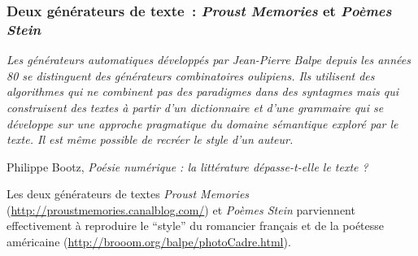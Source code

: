 \documentclass{article}
\newenvironment{citationbox}
{\begin{center}
		\begin{minipage}{.8\textwidth}
		}
		{
		\end{minipage}	
\end{center}
}
\begin{document}
			\subsubsection{Deux générateurs de texte~: \textit{Proust Memories} et \textit{Poèmes Stein}}
				\begin{citationbox}
					\textit{Les générateurs automatiques développés par Jean-Pierre Balpe depuis les années 80
					se distinguent des générateurs combinatoires oulipiens. Ils utilisent des algorithmes qui ne
					combinent pas des paradigmes dans des syntagmes mais qui construisent des textes à partir
					d’un dictionnaire et d’une grammaire qui se développe sur une approche pragmatique du
					domaine sémantique exploré par le texte. Il est même possible de recréer le style d’un auteur. }
					\begin{flushright}
						Philippe Bootz, \textit{Poésie numérique : la littérature dépasse-t-elle le
						texte ?}\cite{bootz2005}
					\end{flushright}
				\end{citationbox}
				Les deux générateurs de textes \textit{Proust Memories} (\href{http://proustmemories.canalblog.com/}{http://proustmemories.canalblog.com/}) et \textit{Poèmes Stein} parviennent effectivement à reproduire le ``style'' du romancier français et de la poétesse américaine (\href{http://brooom.org/balpe/photoCadre.html}{http://brooom.org/balpe/photoCadre.html}).\\ 
				
\end{document}
